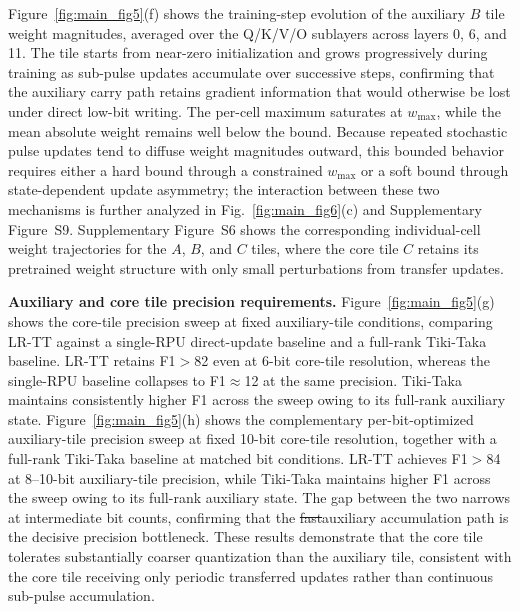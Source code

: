 \documentclass[AMA,LATO2COL]{WileyNJDv5}
\newcommand{\old}[1]{\sout{#1}}
\newcommand{\new}[1]{{\color{red}#1}}
\begin{document}
\noindent
\new{Figure~\ref{fig:main_fig5}(f) shows the training-step evolution of the auxiliary \(B\) tile weight magnitudes, averaged over the Q/K/V/O sublayers across layers 0, 6, and 11. The tile starts from near-zero initialization and grows progressively during training as sub-pulse updates accumulate over successive steps, confirming that the auxiliary carry path retains gradient information that would otherwise be lost under direct low-bit writing. The per-cell maximum saturates at \(w_{\max}\), while the mean absolute weight remains well below the bound. Because repeated stochastic pulse updates tend to diffuse weight magnitudes outward, this bounded behavior requires either a hard bound through a constrained \(w_{\max}\) or a soft bound through state-dependent update asymmetry; the interaction between these two mechanisms is further analyzed in Fig.~\ref{fig:main_fig6}(c) and Supplementary Figure~S9. Supplementary Figure~S6 shows the corresponding individual-cell weight trajectories for the \(A\), \(B\), and \(C\) tiles, where the core tile \(C\) retains its pretrained weight structure with only small perturbations from transfer updates.}

\noindent
\new{\textbf{Auxiliary and core tile precision requirements.}
Figure~\ref{fig:main_fig5}(g) shows the core-tile precision sweep at fixed auxiliary-tile conditions, comparing LR-TT against a single-RPU direct-update baseline and a full-rank Tiki-Taka baseline. LR-TT retains F1\(>\)82 even at 6-bit core-tile resolution, whereas the single-RPU baseline collapses to F1\(\approx\)12 at the same precision. Tiki-Taka maintains consistently higher F1 across the sweep owing to its full-rank auxiliary state. Figure~\ref{fig:main_fig5}(h) shows the complementary per-bit-optimized auxiliary-tile precision sweep at fixed 10-bit core-tile resolution, together with a full-rank Tiki-Taka baseline at matched bit conditions. LR-TT achieves F1\(>\)84 at 8--10-bit auxiliary-tile precision, while Tiki-Taka maintains higher F1 across the sweep owing to its full-rank auxiliary state. The gap between the two narrows at intermediate bit counts, confirming that the \old{fast}\new{auxiliary} accumulation path is the decisive precision bottleneck. These results demonstrate that the core tile tolerates substantially coarser quantization than the auxiliary tile, consistent with the core tile receiving only periodic transferred updates rather than continuous sub-pulse accumulation.}
\end{document}
